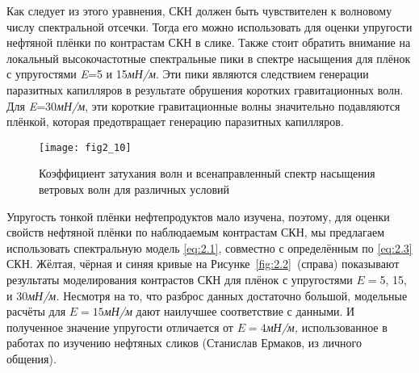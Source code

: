 Как следует из этого уравнения, СКН должен быть чувствителен к волновому числу спектральной отсечки. Тогда его можно использовать для оценки упругости нефтяной плёнки по контрастам СКН в слике. Также стоит обратить внимание на локальный высокочастотные спектральные пики в спектре насыщения для плёнок с упругостями \textit{E}=5 и 15\textit{мН/м}. Эти пики являются следствием генерации паразитных капилляров в результате обрушения коротких гравитационных волн. Для \textit{E}=30\textit{мН/м}, эти короткие гравитационные волны значительно подавляются плёнкой, которая предотвращает генерацию паразитных капилляров.



\begin{figure}[!ht]
   	\centering
	{\texttt{[image: fig2\_10]}}
    \\
    \caption{Коэффициент затухания волн и всенаправленный спектр насыщения ветровых волн для различных условий}
    \label{fig:2.10}
\end{figure}


Упругость тонкой плёнки нефтепродуктов мало изучена, поэтому, для оценки свойств нефтяной плёнки по наблюдаемым контрастам СКН, мы предлагаем использовать спектральную модель \eqref{eq:2.1}, совместно с определённым по \eqref{eq:2.3} СКН. Жёлтая, чёрная и синяя кривые на Рисунке~\ref{fig:2.2}~(справа) показывают результаты моделирования контрастов СКН для плёнок с упругостями $E=$5, 15, и 30\textit{мН/м.} Несмотря на то, что разброс данных достаточно большой, модельные расчёты для $E=15$\textit{мН/м }дают наилучшее соответствие с данными. И полученное значение упругости отличается от $E=4$\textit{мН/м,} использованное в работах по изучению нефтяных сликов (Станислав Ермаков, из личного общения).

